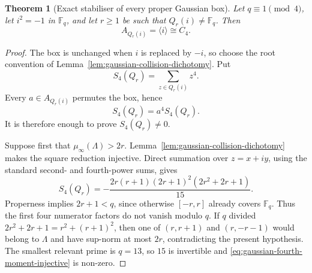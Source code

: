 \documentclass[11pt,a4paper]{article}
\newtheorem{theorem}{Theorem}[section]
\theoremstyle{definition}
\theoremstyle{remark}
\newcommand{\Fq}{\mathbb{F}_q}
\begin{document}
\begin{theorem}[Exact stabiliser of every proper Gaussian box]
  \label{thm:gaussian-box-stabiliser}
  Let $q\equiv1\pmod4$, let $i^2=-1$ in $\Fq$, and let $r\geq1$ be such that
  $Q_r(i)\ne\Fq$.
  Then
  \[
    A_{Q_r(i)}=\langle i\rangle\cong C_4.
  \]
\end{theorem}

\begin{proof}
  The box is unchanged when $i$ is replaced by $-i$, so choose the root convention of
  Lemma~\ref{lem:gaussian-collision-dichotomy}.
  Put
  \[
    S_4(Q_r)=\sum_{z\in Q_r(i)}z^4.
  \]
  Every $a\in A_{Q_r(i)}$ permutes the box, hence
  \begin{equation}
    S_4(Q_r)=a^4S_4(Q_r).
    \label{eq:gaussian-fourth-moment-invariance}
  \end{equation}
  It is therefore enough to prove $S_4(Q_r)\ne0$.

  Suppose first that $\mu_\infty(\Lambda)>2r$.
  Lemma~\ref{lem:gaussian-collision-dichotomy} makes the square reduction injective.
  Direct summation over $z=x+iy$, using the standard second- and fourth-power sums,
  gives
  \begin{equation}
    S_4(Q_r)
    =-\frac{2r(r+1)(2r+1)^2(2r^2+2r+1)}{15}.
    \label{eq:gaussian-fourth-moment-injective}
  \end{equation}
  Properness implies $2r+1<q$, since otherwise $[-r,r]$ already covers $\Fq$.
  Thus the first four numerator factors do not vanish modulo $q$.
  If $q$ divided $2r^2+2r+1=r^2+(r+1)^2$, then one of
  $(r,r+1)$ and $(r,-r-1)$ would belong to $\Lambda$ and have sup-norm at most $2r$,
  contradicting the present hypothesis.
  The smallest relevant prime is $q=13$, so $15$ is invertible and
  \eqref{eq:gaussian-fourth-moment-injective} is non-zero.


\end{proof}
\end{document}
